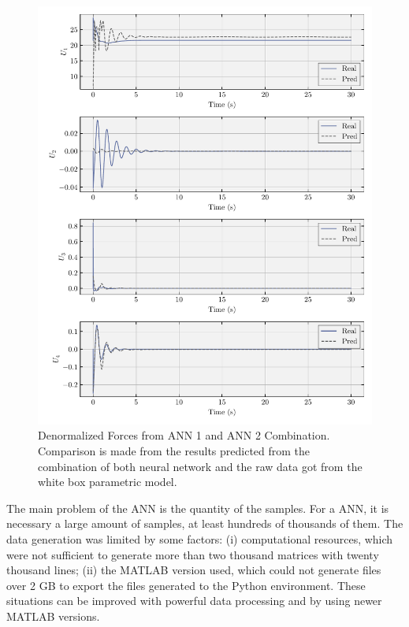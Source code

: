 \begin{figure}[!htb]
    \centering
    \caption[Denormalized Forces from ANN 1 and ANN 2 Combination]{Denormalized Forces from ANN 1 and ANN 2 Combination. Comparison is made from the results predicted from the combination of both neural network and the raw data got from the white box parametric model.}
    \includegraphics{../codes/models/model_alpha/figures/comparison.pdf}    

    \label{fig:forces_denormalized}
\end{figure}

The main problem of the ANN is the quantity of the samples.
For a ANN, it is necessary a large amount of samples, at least hundreds of thousands of them. 
The data generation was limited by some factors: (i) computational resources, which were not sufficient to generate more than two thousand matrices with twenty thousand lines; (ii) the MATLAB version used, which could not generate files over 2 GB to export the files generated to the Python environment. These situations can be improved with powerful data processing and by using newer MATLAB versions.

